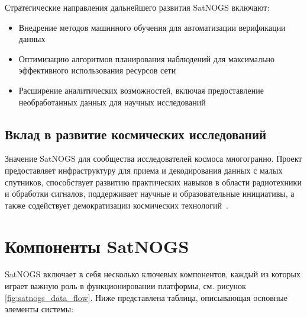 Стратегические направления дальнейшего развития SatNOGS включают:

\begin{itemize}
	\item Внедрение методов машинного обучения для автоматизации верификации данных
	\item Оптимизацию алгоритмов планирования наблюдений для максимально эффективного использования ресурсов сети
	\item Расширение аналитических возможностей, включая предоставление необработанных данных для научных исследований
\end{itemize}

\subsection{Вклад в развитие космических исследований}

Значение SatNOGS для сообщества исследователей космоса многогранно. Проект
предоставляет инфраструктуру для приема и декодирования данных с малых
спутников, способствует развитию практических навыков в области радиотехники и
обработки сигналов, поддерживает научные и образовательные инициативы, а также
содействует демократизации космических технологий~\cite{satnogs_general_docs}.

\section{Компоненты SatNOGS}

SatNOGS включает в себя несколько ключевых компонентов, каждый из которых
играет важную роль в функционировании платформы, см. рисунок
\ref{fig:satnogs_data_flow}.
Ниже представлена таблица, описывающая основные элементы системы:

